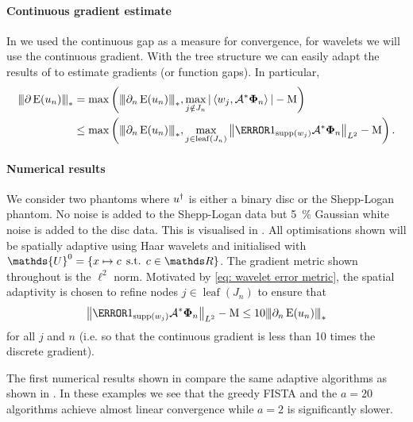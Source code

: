 \documentclass[10pt,a4paper,onecolumn]{article}
\numberwithin{equation}{section}
\let\F\mathds\let\C\mathcal\newcommand{\R}{\F{R}}\newcommand{\A}{\C{A}}
\newcommand{\Norm}[1]{{\left\vert\kern-0.25ex\left\vert\kern-0.25ex\left\vert #1 \right\vert\kern-0.25ex\right\vert\kern-0.25ex\right\vert}}
\newcommand{\norm}[1]{{\left\lVert #1 \right\rVert}}
\newcommand{\IP}[2]{\left\langle #1,#2 \right\rangle}\newcommand{\ip}[2]{#1 \vcenter{\hbox{\resizebox{6pt}{!}{\ensuremath\cdot}}} #2}
\newcommand{\op}[1]{\operatorname{#1}}\newcommand{\overtext}[2]{\stackrel{\text{#1}}{#2}}
\DeclareMathOperator{\st}{\;s.t.\;}\DeclareMathOperator{\as}{\;a.s.\;}\renewcommand{\epsilon}{\varepsilon}
\renewcommand{\vec}{\mathbf}
\newcommand*{\Func}[1]{%
	\IfEqCase{#1}{%
		{0}{\op{E}}%
		{1}{\op{F}}%
		{2}{\op{G}}%
		{3}{\op{H}}%
	}[\op{F}#1]%
}
\newcommand*{\varf}[1]{%
	\IfEqCase{#1}{%
		{0}{u}%
		{1}{v}%
		{2}{w}%
	}[u#1]%
}
\newcommand*{\spcf}[1]{%
	\IfEqCase{#1}{%
		{0}{\F{U}}%
		{1}{\F{V}}%
		{2}{\F{W}}%
	}[\F{U}#1]%
}
\newcommand*{\vard}[1]{%
	\IfEqCase{#1}{%
		{0}{\varphi}%
		{1}{\psi}%
	}[\varphi #1]%
}
\newcommand*{\varx}[1]{%
	\IfEqCase{#1}{%
		{0}{x}%
		{1}{y}%
		{2}{z}%
		{3}{r}%
	}[x#1]%
}
\newcommand*{\data}[1]{%
	\IfEqCase{#1}{%
		{0}{\eta}%
		{1}{\nu}%
	}[g]%
}
\newcommand*{\vvard}[1]{\vec{\vard{#1}}}\newcommand*{\vdata}[1]{\vec{\data{#1}}}
\begin{document}
\paragraph{Continuous gradient estimate}
In  we used the continuous gap as a measure for convergence, for wavelets we will use the continuous gradient. With the tree structure we can easily adapt the results of  to estimate gradients (or function gaps). In particular,
\begin{align}
	\Norm{\partial \Func0(\varf0_n)}_* &=\max\left(\Norm{\partial_n\Func0(\varf0_n)}_*, \max_{j\notin J_n} |\IP{w_j}{\A^*\vvard0_n}| -\mu \right) \\&\leq\max\left(\Norm{\partial_n\Func0(\varf0_n)}_*, \max_{j\in \op{leaf}(J_n)} \norm{\1_{\supp(w_j)}\A^*\vvard0_n}_{L^2} -\mu \right).\label{eq: wavelet error metric}
\end{align}

\paragraph{Numerical results}
We consider two phantoms where $\varf0^\dagger$ is either a binary disc or the Shepp-Logan phantom. No noise is added to the Shepp-Logan data but \SI{5}{\percent} Gaussian white noise is added to the disc data. This is visualised in . All optimisations shown will be spatially adaptive using Haar wavelets and initialised with $\spcf0^0= \{\varx0\mapsto c\st c\in\F R\}$. The gradient metric shown throughout is the $\ell^2$ norm. Motivated by \eqref{eq: wavelet error metric}, the spatial adaptivity is chosen to refine nodes $j\in\op{leaf}(J_n)$ to ensure that 
$$ \norm{\1_{\supp(w_j)}\A^*\vvard0_n}_{L^2} -\mu  \leq 10\Norm{\partial_n\Func0(\varf0_n)}_*$$
for all $j$ and $n$ (i.e. so that the continuous gradient is less than 10 times the discrete gradient).

The first numerical results shown in  compare the same adaptive algorithms as shown in . In these examples we see that the greedy FISTA and the $a=20$ algorithms achieve almost linear convergence while $a=2$ is significantly slower.
\end{document}
